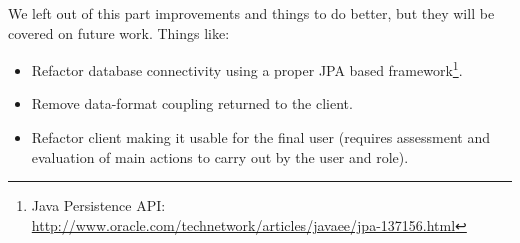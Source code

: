 We left out of this part improvements and things to do better, but they will be
covered on future work. Things like:

\begin{itemize}
	\item Refactor database connectivity using a proper JPA based framework\footnote{Java Persistence API:
	\url{http://www.oracle.com/technetwork/articles/javaee/jpa-137156.html}}.
	\item Remove data-format coupling returned to the client.
	\item Refactor client making it usable for the final user (requires assessment
	and evaluation of main actions to carry out by the user and role).
\end{itemize}

%
